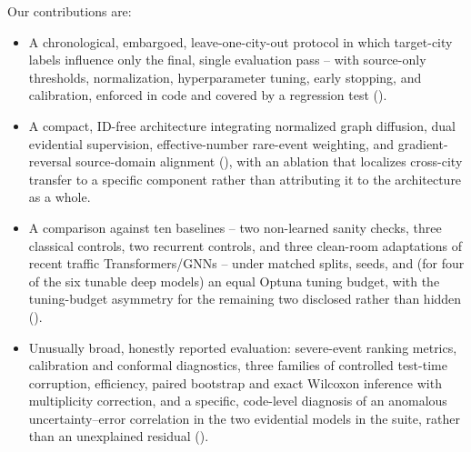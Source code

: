 Our contributions are:
\begin{itemize}
  \item A chronological, embargoed, leave-one-city-out protocol in which target-city labels
        influence only the final, single evaluation pass -- with source-only thresholds,
        normalization, hyperparameter tuning, early stopping, and calibration, enforced in code and
        covered by a regression test ().
  \item A compact, ID-free architecture integrating normalized graph diffusion, dual evidential
        supervision, effective-number rare-event weighting, and gradient-reversal source-domain
        alignment (), with an ablation that localizes cross-city transfer to a
        specific component rather than attributing it to the architecture as a whole.
  \item A comparison against ten baselines -- two non-learned sanity checks, three classical
        controls, two recurrent controls, and three clean-room adaptations of recent traffic
        Transformers/GNNs -- under matched splits, seeds, and (for four of the six tunable deep
        models) an equal Optuna tuning budget, with the tuning-budget asymmetry for the remaining
        two disclosed rather than hidden ().
  \item Unusually broad, honestly reported evaluation: severe-event ranking metrics, calibration
        and conformal diagnostics, three families of controlled test-time corruption, efficiency,
        paired bootstrap and exact Wilcoxon inference with multiplicity correction, and a specific,
        code-level diagnosis of an anomalous uncertainty--error correlation in the two evidential
        models in the suite, rather than an unexplained residual ().
\end{itemize}
